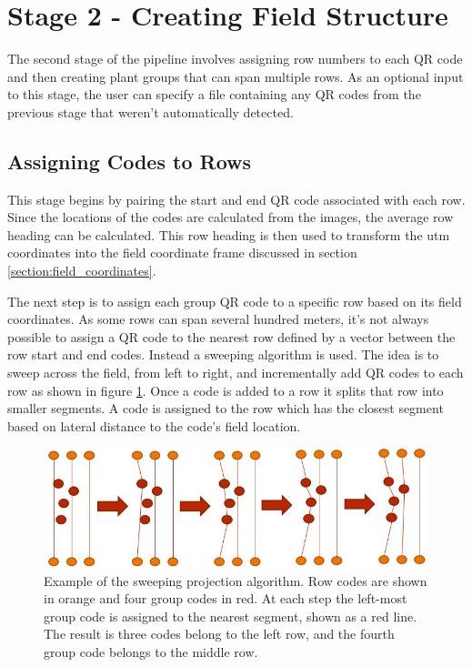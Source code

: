 \section{Stage 2 - Creating Field Structure}
\label{processing-stage2}

The second stage of the pipeline involves assigning row numbers to each QR code and then creating plant groups that can span multiple rows.  As an optional input to this stage, the user can specify a file containing any QR codes from the previous stage that weren't automatically detected.  

\subsection{Assigning Codes to Rows}

This stage begins by pairing the start and end QR code associated with each row.  Since the locations of the codes are calculated from the images, the average row heading can be calculated.  This row heading is then used to transform the \ac{utm} coordinates into the field coordinate frame discussed in section \ref{section:field_coordinates}.

The next step is to assign each group QR code to a specific row based on its field coordinates.  As some rows can span several hundred meters, it's not always possible to assign a QR code to the nearest row defined by a vector between the row start and end codes.  Instead a sweeping algorithm is used.   The idea is to sweep across the field, from left to right, and incrementally add QR codes to each row as shown in figure \ref{figure:sweeping_algorithm}. Once a code is added to a row it splits that row into smaller segments.  A code is assigned to the row which has the closest segment based on lateral distance to the code's field location. 

\begin{figure}
	\centering
    \includegraphics[width=6in]{figures/sweeping_algorithm.jpg}
    \caption[Sweeping projection algorithm]{Example of the sweeping projection algorithm. Row codes are shown in orange and four group codes in red.  At each step the left-most group code is assigned to the nearest segment, shown as a red line.  The result is three codes belong to the left row, and the fourth group code belongs to the middle row.}
    \label{figure:sweeping_algorithm}
\end{figure}

